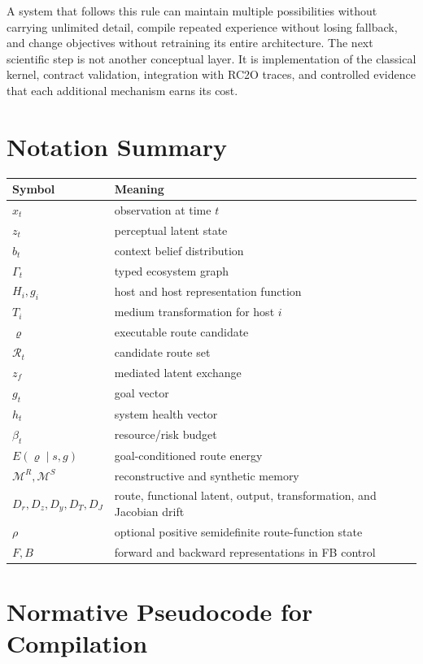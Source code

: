 \documentclass[10pt]{article}
\newcommand{\M}{\mathcal{M}}
\newcommand{\Rset}{\mathcal{R}}
\begin{document}
A system that follows this rule can maintain multiple possibilities without carrying unlimited detail, compile repeated experience without losing fallback, and change objectives without retraining its entire architecture. The next scientific step is not another conceptual layer. It is implementation of the classical kernel, contract validation, integration with RC2O traces, and controlled evidence that each additional mechanism earns its cost.

\appendix
\section{Notation Summary}

\begin{longtable}{p{}p{}}
\toprule
Symbol & Meaning \\
\midrule
$x_t$ & observation at time $t$ \\
$z_t$ & perceptual latent state \\
$b_t$ & context belief distribution \\
$\Gamma_t$ & typed ecosystem graph \\
$H_i,g_i$ & host and host representation function \\
$T_i$ & medium transformation for host $i$ \\
$\varrho$ & executable route candidate \\
$\Rset_t$ & candidate route set \\
$z_f$ & mediated latent exchange \\
$g_t$ & goal vector \\
$h_t$ & system health vector \\
$\beta_t$ & resource/risk budget \\
$E(\varrho\mid s,g)$ & goal-conditioned route energy \\
$\M^R,\M^S$ & reconstructive and synthetic memory \\
$D_r,D_z,D_y,D_T,D_J$ & route, functional latent, output, transformation, and Jacobian drift \\
$\rho$ & optional positive semidefinite route-function state \\
$F,B$ & forward and backward representations in FB control \\
\bottomrule
\end{longtable}

\section{Normative Pseudocode for Compilation}
\end{document}
